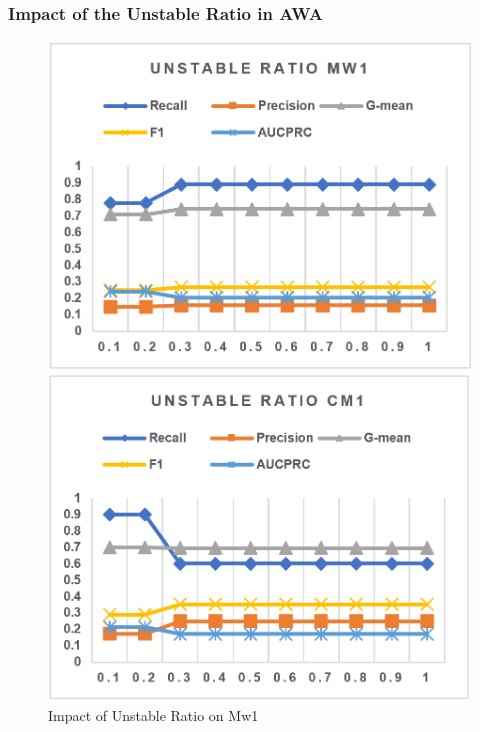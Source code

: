 \subsubsection{Impact of the Unstable Ratio in AWA}
\begin{figure}[H]
    \centering 
    \begin{minipage}{0.45\textwidth}
        \includegraphics[width=\textwidth]{images/fig34}
        \caption{Impact of Unstable Ratio on Mw1}
        \label{fig34}
    \end{minipage}
    \quad
    \begin{minipage}{0.45\textwidth}
        \includegraphics[width=\textwidth]{images/fig35}

\end{minipage}
\end{figure}
